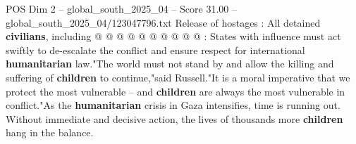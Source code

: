 \begin{textsample}{POS Dim 2 – global\_south\_2025\_04 – Score 31.00 – global\_south\_2025\_04/123047796.txt}
Release of hostages : All detained \textbf{civilians}, including @ @ @ @ @ @ @ @ @ @ : States with influence must act swiftly to de-escalate the conflict and ensure respect for international \textbf{humanitarian} law."The world must not stand by and allow the killing and suffering of \textbf{children} to continue,"said Russell."It is a moral imperative that we protect the most vulnerable -- and \textbf{children} are always the most vulnerable in conflict."As the \textbf{humanitarian} crisis in Gaza intensifies, time is running out.
Without immediate and decisive action, the lives of thousands more \textbf{children} hang in the balance.

\end{textsample}
